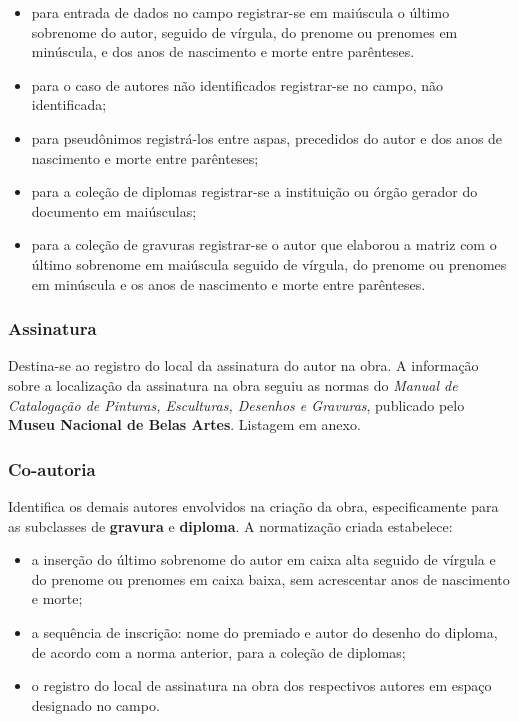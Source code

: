 \begin{itemize}
	\item para entrada de dados no campo registrar-se em maiúscula o último sobrenome do autor, seguido de vírgula, do prenome ou prenomes em minúscula, e dos anos de nascimento e morte entre parênteses.
	\item para o caso de autores não identificados registrar-se no campo, não identificada;
	\item para pseudônimos registrá-los entre aspas, precedidos do autor e dos anos de nascimento e morte entre parênteses;
	\item para a coleção de diplomas registrar-se a instituição ou órgão gerador do documento em maiúsculas;
	\item para a coleção de gravuras registrar-se o autor que elaborou a matriz com o último sobrenome em maiúscula seguido de vírgula, do prenome ou prenomes em minúscula e os anos de nascimento e morte entre parênteses.
\end{itemize}

\subsubsection{Assinatura}
Destina-se ao registro do local da assinatura do autor na obra. A informação sobre a localização da assinatura na obra seguiu as normas do \textit{Manual de Catalogação de Pinturas, Esculturas, Desenhos e Gravuras}, publicado pelo \textbf{Museu Nacional de Belas Artes}. Listagem em anexo.

\subsubsection{Co-autoria}
Identifica os demais autores envolvidos na criação da obra, especificamente para as subclasses de \textbf{gravura} e \textbf{diploma}. A normatização criada estabelece:
\begin{itemize}
	\item a inserção do último sobrenome do autor em caixa alta seguido de vírgula e do prenome ou prenomes em caixa baixa, sem acrescentar anos de nascimento e morte;
	\item a sequência de inscrição: nome do premiado e autor do desenho do diploma, de acordo com a norma anterior, para a coleção de diplomas;
	\item o registro do local de assinatura na obra dos respectivos autores em espaço designado no campo.
\end{itemize}

